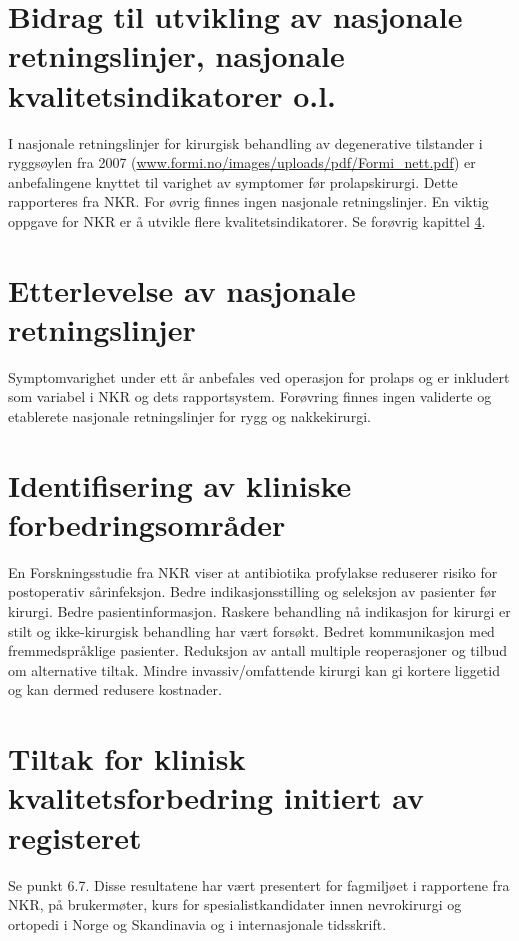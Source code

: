 \documentclass[norsk, a4paper, twocolumn]{report}
\begin{document}
\section{Bidrag til utvikling av nasjonale retningslinjer, nasjonale
kvalitetsindikatorer o.l.}\label{sec:retut}


I nasjonale retningslinjer for kirurgisk behandling av degenerative tilstander i ryggsøylen fra 2007 (\url{www.formi.no/images/uploads/pdf/Formi\_nett.pdf}) er anbefalingene knyttet til varighet av symptomer før prolapskirurgi. Dette rapporteres fra NKR. For øvrig finnes ingen nasjonale retningslinjer. En viktig oppgave for NKR er å utvikle flere kvalitetsindikatorer. Se forøvrig kapittel \ref{sec:brures}.

\section{Etterlevelse av nasjonale retningslinjer}\label{sec:retbru} 
Symptomvarighet under ett år anbefales ved operasjon for prolaps og er inkludert som variabel i NKR og dets rapportsystem. Forøvring finnes ingen validerte og etablerete nasjonale retningslinjer for rygg og nakkekirurgi.

\section{Identifisering av kliniske forbedringsområder}\label{sec:ide}
En Forskningsstudie fra NKR viser at antibiotika profylakse reduserer risiko for postoperativ sårinfeksjon. Bedre indikasjonsstilling og seleksjon av pasienter før kirurgi. Bedre pasientinformasjon. Raskere behandling nå indikasjon for kirurgi er stilt og ikke-kirurgisk behandling har vært forsøkt. Bedret kommunikasjon med fremmedspråklige pasienter. Reduksjon av antall multiple reoperasjoner og tilbud om alternative tiltak. Mindre invassiv/omfattende kirurgi kan gi kortere liggetid og kan dermed redusere kostnader.

\section{Tiltak for klinisk kvalitetsforbedring initiert av
registeret}\label{sec:brures}

Se punkt 6.7.  Disse resultatene har vært presentert for fagmiljøet i rapportene fra NKR, på brukermøter, kurs for spesialistkandidater innen nevrokirurgi og ortopedi i Norge og Skandinavia og i internasjonale tidsskrift.  
\end{document}
